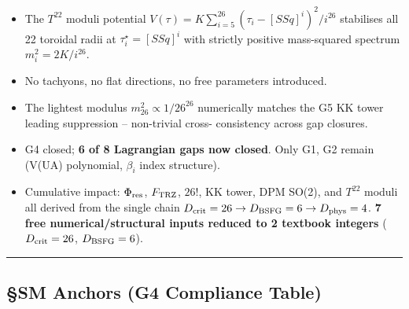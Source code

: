 \documentclass[
]{article}
\providecommand{\tightlist}{%
  \setlength{\itemsep}{0pt}\setlength{\parskip}{0pt}}
\begin{document}
\begin{itemize}
\tightlist
\item
  The \(T^{22}\) moduli potential \(V(\tau) = K\sum_{i=5}^{26}
  (\tau_i-[SSq]^i)^2/i^{26}\) stabilises all 22 toroidal radii at
  \(\tau_i^\star = [SSq]^i\) with strictly positive mass-squared
  spectrum \(m_i^2 = 2K/i^{26}\).
\item
  No tachyons, no flat directions, no free parameters introduced.
\item
  The lightest modulus \(m_{26}^2 \propto 1/26^{26}\) numerically
  matches the G5 KK tower leading suppression -- non-trivial cross-
  consistency across gap closures.
\item
  G4 closed; \textbf{6 of 8 Lagrangian gaps now closed}. Only G1, G2
  remain (V(UA) polynomial, \(\beta_i\) index structure).
\item
  Cumulative impact: \(\Phi_{\rm res}\), \(F_{\rm TRZ}\), \(26!\), KK
  tower, DPM SO(2), and \(T^{22}\) moduli all derived from the single
  chain \(D_{\rm crit}=26 \to D_{\rm BSFG}=6 \to D_{\rm phys}=4\).
  \textbf{7 free numerical/structural inputs reduced to 2 textbook
  integers} (\(D_{\rm crit}=26\), \(D_{\rm BSFG}=6\)).
\end{itemize}

\begin{center}\rule{0.5\linewidth}{0.5pt}\end{center}

\subsection{§SM Anchors (G4 Compliance
Table)}\label{sm-anchors-g4-compliance-table}
\end{document}
